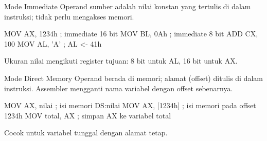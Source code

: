 \documentclass[aspectratio=169,11pt]{beamer}
\begin{document}
\begin{frame}[fragile]{Mode Immediate}
\small
Operand sumber adalah nilai konstan yang tertulis di dalam instruksi;
tidak perlu mengakses memori.

\vspace{0.2em}
\begin{kodeasm}[numbers=none]
MOV AX, 1234h       ; immediate 16 bit
MOV BL, 0Ah         ; immediate 8 bit
ADD CX, 100
MOV AL, 'A'         ; AL <- 41h
\end{kodeasm}

\vspace{0.15em}
{\footnotesize\color{obeGray}Ukuran nilai mengikuti register tujuan:
8 bit untuk AL, 16 bit untuk AX.\par}
\end{frame}

\begin{frame}[fragile]{Mode Direct Memory}
\small
Operand berada di memori; alamat (offset) ditulis di dalam instruksi.
Assembler mengganti nama variabel dengan offset sebenarnya.

\vspace{0.2em}
\begin{kodeasm}[numbers=none]
MOV AX, nilai       ; isi memori DS:nilai
MOV AX, [1234h]     ; isi memori pada offset 1234h
MOV total, AX       ; simpan AX ke variabel total
\end{kodeasm}

\vspace{0.15em}
{\footnotesize\color{obeGray}Cocok untuk variabel tunggal dengan
alamat tetap.\par}
\end{frame}
\end{document}

